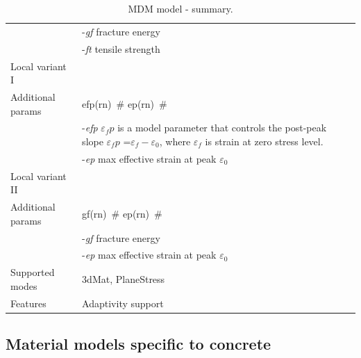 \documentclass[epsf,a4paper]{article}
\newcommand{\elemparam}[2]{{{#1\tiny (#2)}~\#}}
\newcommand{\param}[1]{{\it #1}}
\begin{document}
\begin{table}[h]
\begin{tabular}{|l|p{9cm}|}
& -\param{gf} fracture energy\\
& -\param{ft} tensile strength\\
\hline
Local variant I&\\
Additional params &\elemparam{efp}{rn} \elemparam{ep}{rn}\\
& -\param{efp} $\varepsilon_fp$ is a model parameter that controls
the post-peak slope $\varepsilon_fp$ =$\varepsilon_f-\varepsilon_0$,
where $\varepsilon_f$ is strain at zero stress level.\\
& -\param{ep} max effective strain at peak $\varepsilon_0$\\
\hline
Local variant II&\\
Additional params &\elemparam{gf}{rn} \elemparam{ep}{rn}\\
& -\param{gf} fracture energy\\
& -\param{ep} max effective strain at peak $\varepsilon_0$\\
\hline
Supported modes& 3dMat, PlaneStress\\
Features & Adaptivity support\\
\hline
\end{tabular}                                                                   
\caption{MDM model - summary.}                
\label{mdm_table}                                                         
\end{table}                                                                     



\subsection{Material models specific to concrete}
\end{document}
